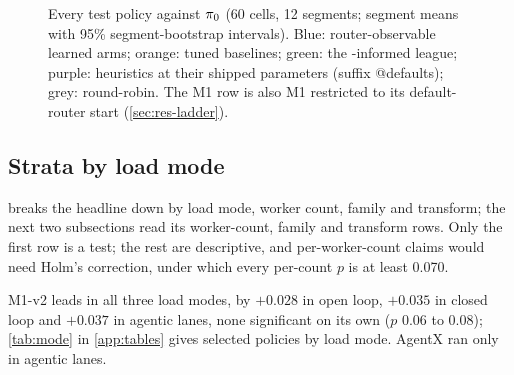\begin{figure}[tbp]
  \centering
  
  \caption{Every test policy against $\pi_{0}$ (60 cells, 12 segments; segment means with 95\%
    segment-bootstrap intervals). Blue: router-observable learned arms; orange: tuned baselines;
    green: the \ais{}-informed league; purple: heuristics at their shipped parameters (suffix
    @defaults); grey: round-robin. The M1 row is also M1 restricted to its default-router start
    (\cref{sec:res-ladder}).}
  \label{fig:leaderboard}
\end{figure}

\subsection{Strata by load mode}
\label{sec:res-strata}

 breaks the headline down by load mode, worker count, family and transform; the
next two subsections read its worker-count, family and transform rows. Only the first row is a
test; the rest are descriptive, and per-worker-count claims would need Holm's correction, under
which every per-count $p$ is at least 0.070.

\begin{table}[tbp]
  \centering
  \caption{The headline by stratum, M1-v2 minus tuned . One-sided exact
    Wilcoxon $p$ over the stratum's segments; only the first row is a test. Rows marked $\dagger$
    use the within-segment cell bootstrap.}
  \label{tab:strata}
  
\end{table}

M1-v2 leads in all three load modes, by $+0.028$ in open loop, $+0.035$ in closed loop and $+0.037$
in agentic lanes, none significant on its own ($p$ 0.06 to 0.08); \cref{tab:mode} in
\cref{app:tables} gives selected policies by load mode. AgentX ran only in agentic lanes.

